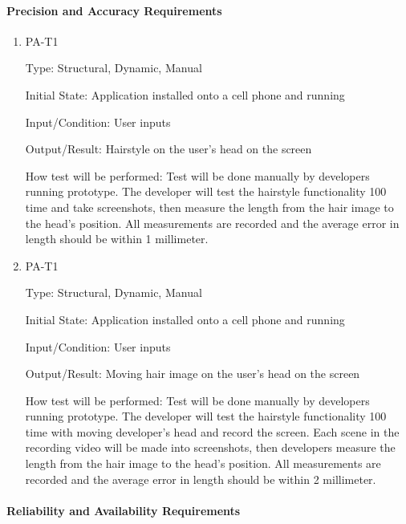 \documentclass[12pt, titlepage]{article}
\begin{document}
\paragraph{Precision and Accuracy Requirements}

\begin{enumerate}

\item{PA-T1\\}

Type: Structural, Dynamic, Manual
					
Initial State: Application installed onto a cell phone and running
					
Input/Condition: User inputs
					
Output/Result: Hairstyle on the user's head on the screen
					
How test will be performed: Test will be done manually by developers running prototype. The developer will test the hairstyle functionality 100 time and take screenshots, then measure the length from the hair image to the head's position. All measurements are recorded and the average error in length should be within 1 millimeter.
					
\item{PA-T1\\}

Type: Structural, Dynamic, Manual
					
Initial State: Application installed onto a cell phone and running
					
Input/Condition: User inputs
					
Output/Result: Moving hair image on the user's head on the screen
					
How test will be performed: Test will be done manually by developers running prototype. The developer will test the hairstyle functionality 100 time with moving developer's head and record the screen. Each scene in the recording video will be made into screenshots, then developers measure the length from the hair image to the head's position. All measurements are recorded and the average error in length should be within 2 millimeter.

\end{enumerate}

\paragraph{Reliability and Availability Requirements}
\end{document}
